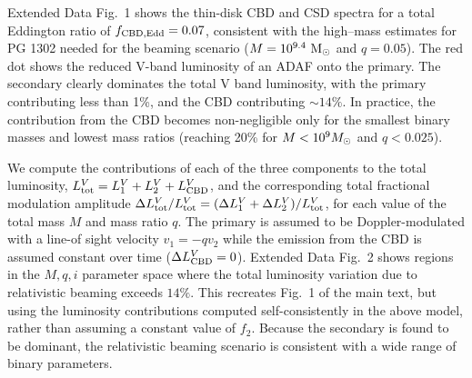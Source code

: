 Extended Data Fig.~1 %
shows the thin-disk CBD and CSD spectra
for a total Eddington ratio of $f_{\rm{CBD,Edd}}=0.07$, consistent
with the high--mass estimates for PG 1302 needed for the beaming
scenario ($M=10^{9.4}~{\rm M_\odot}$ and $q=0.05$).  The red dot shows
the reduced V-band luminosity of an ADAF onto the primary. The
secondary clearly dominates the total V band luminosity, with the
primary contributing less than 1\%, and the CBD contributing $\sim
14\%$.  In practice, the contribution from the CBD becomes
non-negligible only for the smallest binary masses and lowest mass
ratios (reaching 20\% for $M<10^{9}{M_{\odot}}$ and $q<0.025$).


We compute the contributions of each of the three components to the
total luminosity, $L^V_{\rm tot}= L^V_1 + L^V_2 + L^V_{\rm CBD}$, and
the corresponding total fractional modulation amplitude $\Delta
L^V_{\rm tot} / L^V_{\rm tot} = (\Delta L^V_1 + \Delta L^V_2) /
L^V_{\rm tot}$, for each value of the total mass $M$ and mass ratio
$q$.  The primary is assumed to be Doppler-modulated with a line-of
sight velocity $v_1=-q v_2$ while the emission from the CBD is assumed
constant over time ($\Delta L^V_{\rm
  CBD}=0$). Extended Data Fig.~2 %
shows regions in the $M,q,i$ parameter space where the total
luminosity variation due to relativistic beaming exceeds $14\%$.  This
recreates Fig.~1 of the main text, but using the luminosity
contributions computed self-consistently in the above model, rather
than assuming a constant value of $f_2$. Because the secondary is
found to be dominant, the relativistic beaming scenario is consistent
with a wide range of binary parameters.

















